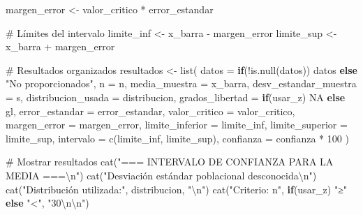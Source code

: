\documentclass[
  spanish,
  letterpaper,
]{book}
\newenvironment{Shaded}{\begin{snugshade}}{\end{snugshade}}
\newcommand{\AttributeTok}[1]{\textcolor[rgb]{0.40,0.45,0.13}{#1}}
\newcommand{\CommentTok}[1]{\textcolor[rgb]{0.37,0.37,0.37}{#1}}
\newcommand{\ConstantTok}[1]{\textcolor[rgb]{0.56,0.35,0.01}{#1}}
\newcommand{\ControlFlowTok}[1]{\textcolor[rgb]{0.00,0.23,0.31}{\textbf{#1}}}
\newcommand{\DecValTok}[1]{\textcolor[rgb]{0.68,0.00,0.00}{#1}}
\newcommand{\FunctionTok}[1]{\textcolor[rgb]{0.28,0.35,0.67}{#1}}
\newcommand{\NormalTok}[1]{\textcolor[rgb]{0.00,0.23,0.31}{#1}}
\newcommand{\OtherTok}[1]{\textcolor[rgb]{0.00,0.23,0.31}{#1}}
\newcommand{\SpecialCharTok}[1]{\textcolor[rgb]{0.37,0.37,0.37}{#1}}
\newcommand{\StringTok}[1]{\textcolor[rgb]{0.13,0.47,0.30}{#1}}
\begin{document}
\begin{Shaded}
\begin{Highlighting}[]
\NormalTok{  margen\_error }\OtherTok{\textless{}{-}}\NormalTok{ valor\_critico }\SpecialCharTok{*}\NormalTok{ error\_estandar}
  
  \CommentTok{\# Límites del intervalo}
\NormalTok{  limite\_inf }\OtherTok{\textless{}{-}}\NormalTok{ x\_barra }\SpecialCharTok{{-}}\NormalTok{ margen\_error}
\NormalTok{  limite\_sup }\OtherTok{\textless{}{-}}\NormalTok{ x\_barra }\SpecialCharTok{+}\NormalTok{ margen\_error}
  
  \CommentTok{\# Resultados organizados}
\NormalTok{  resultados }\OtherTok{\textless{}{-}} \FunctionTok{list}\NormalTok{(}
    \AttributeTok{datos =} \ControlFlowTok{if}\NormalTok{(}\SpecialCharTok{!}\FunctionTok{is.null}\NormalTok{(datos)) datos }\ControlFlowTok{else} \StringTok{"No proporcionados"}\NormalTok{,}
    \AttributeTok{n =}\NormalTok{ n,}
    \AttributeTok{media\_muestra =}\NormalTok{ x\_barra,}
    \AttributeTok{desv\_estandar\_muestra =}\NormalTok{ s,}
    \AttributeTok{distribucion\_usada =}\NormalTok{ distribucion,}
    \AttributeTok{grados\_libertad =} \ControlFlowTok{if}\NormalTok{(usar\_z) }\ConstantTok{NA} \ControlFlowTok{else}\NormalTok{ gl,}
    \AttributeTok{error\_estandar =}\NormalTok{ error\_estandar,}
    \AttributeTok{valor\_critico =}\NormalTok{ valor\_critico,}
    \AttributeTok{margen\_error =}\NormalTok{ margen\_error,}
    \AttributeTok{limite\_inferior =}\NormalTok{ limite\_inf,}
    \AttributeTok{limite\_superior =}\NormalTok{ limite\_sup,}
    \AttributeTok{intervalo =} \FunctionTok{c}\NormalTok{(limite\_inf, limite\_sup),}
    \AttributeTok{confianza =}\NormalTok{ confianza }\SpecialCharTok{*} \DecValTok{100}
\NormalTok{  )}
  
  \CommentTok{\# Mostrar resultados}
  \FunctionTok{cat}\NormalTok{(}\StringTok{"=== INTERVALO DE CONFIANZA PARA LA MEDIA ===}\SpecialCharTok{\textbackslash{}n}\StringTok{"}\NormalTok{)}
  \FunctionTok{cat}\NormalTok{(}\StringTok{"Desviación estándar poblacional desconocida}\SpecialCharTok{\textbackslash{}n}\StringTok{"}\NormalTok{)}
  \FunctionTok{cat}\NormalTok{(}\StringTok{"Distribución utilizada:"}\NormalTok{, distribucion, }\StringTok{"}\SpecialCharTok{\textbackslash{}n}\StringTok{"}\NormalTok{)}
  \FunctionTok{cat}\NormalTok{(}\StringTok{"Criterio: n"}\NormalTok{, }\ControlFlowTok{if}\NormalTok{(usar\_z) }\StringTok{"≥"} \ControlFlowTok{else} \StringTok{"\textless{}"}\NormalTok{, }\StringTok{"30}\SpecialCharTok{\textbackslash{}n\textbackslash{}n}\StringTok{"}\NormalTok{)}
  

\end{Highlighting}
\end{Shaded}
\end{document}
